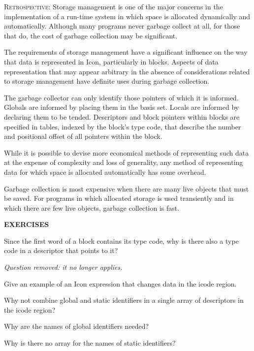 \textsc{Retrospective}: Storage management is one of the major
concerns in the implementation of a run-time system in which space is
allocated dynamically and automatically. Although many programs never
garbage collect at all, for those that do, the cost of garbage
collection may be significant.

The requirements of storage management have a significant influence on
the way that data is represented in Icon, particularly in
blocks. Aspects of data representation that may appear arbitrary in
the absence of considerations related to storage management have
definite uses during garbage collection.

The garbage collector can only identify those pointers of which it is
informed. Globals are informed by placing them in the basis
set. Locals are informed by declaring them to be tended. Descriptors
and block pointers within blocks are specified in tables, indexed by
the block's type code, that describe the number and positional offset
of all pointers within the block.

While it is possible to devise more economical methods of representing
such data at the expense of complexity and loss of generality, any
method of representing data for which space is allocated automatically
has some overhead.

Garbage collection is most expensive when there are many live objects
that must be saved. For programs in which allocated storage is used
transiently and in which there are few live objects, garbage
collection is fast.

\bigskip

\noindent\textbf{EXERCISES}

 Since the first word of a block contains its type
code, why is there also a type code in a descriptor that points to it?

{\em Question removed: it no longer applies.}

 Give an example of an Icon expression that
changes data in the icode region.

 Why not combine global and static identifiers in
a single array of descriptors in the icode region?

 Why are the names of global identifiers needed?

 Why is there no array for the names of static identifiers?

